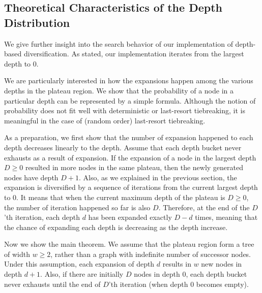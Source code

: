 \subsection{Theoretical Characteristics of the Depth Distribution}

We give further insight into the search behavior of our implementation
of depth-based diversification.
As stated, our implementation iterates from the largest depth to 0.

We are particularly interested in how the expansions happen among the
various depths in the plateau region.
We show that the probability of a node in a particular depth
can be represented by a simple formula.  Although the notion of
probability does not fit well with deterministic \fifo or \lifo
last-resort tiebreaking, it is meaningful in the case of \ro (random
order) last-resort tiebreaking.


As a preparation, we first show that the number of expansion happened to each depth decreases
linearly to the depth.
% 
Assume that each depth bucket never exhausts as a result of
expansion.  If the expansion of a node in the largest depth $D\geq 0$ resulted
in more nodes in the same plateau, then the newly generated nodes have
depth $D+1$.  Also, as we explained in the previous section, the
expansion is diversified by a sequence of iterations from the current
largest depth to 0.  It means that when the current maximum depth of
the plateau is $D\geq 0$, the number of iteration happened so far is also $D$.
Therefore, at the end of the $D$'th iteration, each depth $d$ has
been expanded exactly $D-d$ times, meaning that the chance of
expanding each depth is decreasing as the depth increase.

Now we show the main theorem.
We assume that the plateau region form a tree of width
$w\geq 2$, rather than a graph with indefinite number of successor
nodes.  Under this assumption, each expansion of depth $d$ results in
$w$ new nodes in depth $d+1$. Also, if there are initially
$D$ nodes in depth 0, each depth bucket never exhausts until the end of $D$'th
iteration (when depth 0 becomes empty).

